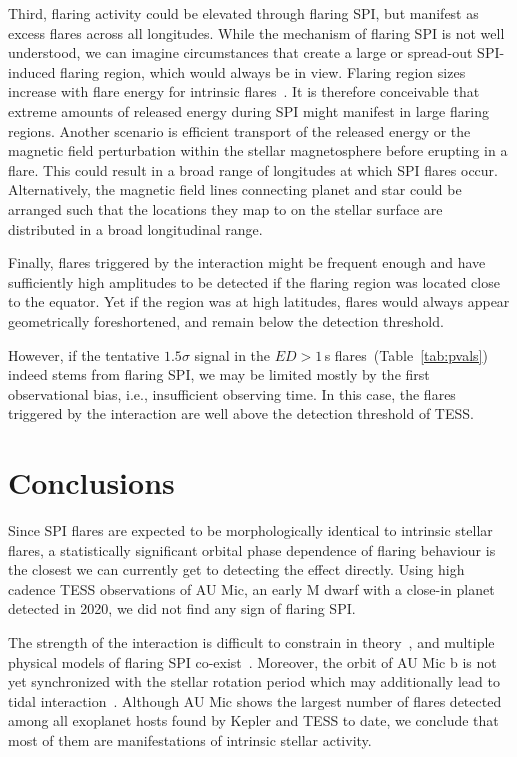 \documentclass[fleqn,usenatbib]{mnras}%
\begin{document}
Third, flaring activity could be elevated through flaring SPI, but manifest as excess flares across all longitudes. While the mechanism of flaring SPI is not well understood, we can imagine circumstances that create a large or spread-out SPI-induced flaring region, which would always be in view. Flaring region sizes increase with flare energy for intrinsic flares~\citep{sammis2000dependence, notsu2019kepler, howard2020evryflare}. It is therefore conceivable that extreme amounts of released energy during SPI might manifest in large flaring regions. Another scenario is efficient transport of the released energy or the magnetic field perturbation within the stellar magnetosphere before erupting in a flare. This could result in a broad range of longitudes at which SPI flares occur. Alternatively, the magnetic field lines connecting planet and star could be arranged such that the locations they map to on the stellar surface are distributed in a broad longitudinal range.

Finally, flares triggered by the interaction might be frequent enough and have sufficiently high amplitudes to be detected if the flaring region was located close to the equator. Yet if the region was at high latitudes, flares would always appear geometrically foreshortened, and remain below the detection threshold.

However, if the tentative $1.5\sigma$ signal in the $ED>1$\,s flares~(Table~\ref{tab:pvals}) indeed stems from flaring SPI, we may be limited mostly by the first observational bias, i.e., insufficient observing time. In this case, the flares triggered by the interaction are well above the detection threshold of TESS.

\section{Conclusions}
\label{sec:conclusions}
Since SPI flares are expected to be morphologically identical to intrinsic stellar flares, a statistically significant orbital phase dependence of flaring behaviour is the closest we can currently get to detecting the effect directly. Using high cadence TESS observations of AU Mic, an early M dwarf with a close-in planet detected in 2020, we did not find any sign of flaring SPI.

The strength of the interaction is difficult to constrain in theory~\citep{strugarek2019}, and multiple physical models of flaring SPI co-exist~\citep{lanza2018close-by, saur2013magnetic}. Moreover, the orbit of AU Mic b is not yet synchronized with the stellar rotation period which may additionally lead to tidal interaction~\citep{cuntz2000stellar}. Although AU Mic shows the largest number of flares detected among all exoplanet hosts found by Kepler and TESS to date, we conclude that most of them are manifestations of intrinsic stellar activity. 
\end{document}
